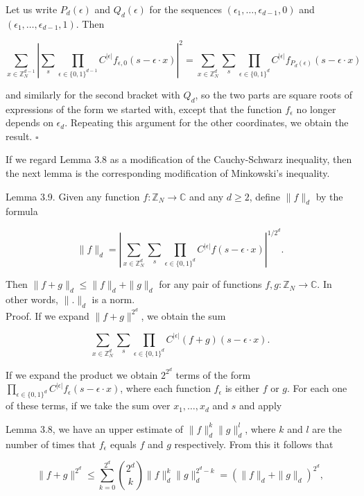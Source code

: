 \documentclass[10pt]{article}
\begin{document}
Let us write $P_{d}(\epsilon)$ and $Q_{d}(\epsilon)$ for the sequences $\left(\epsilon_{1}, \ldots, \epsilon_{d-1}, 0\right)$ and $\left(\epsilon_{1}, \ldots, \epsilon_{d-1}, 1\right)$. Then

$$
\sum_{x \in \mathbb{Z}_{N}^{d-1}}\left|\sum_{s} \prod_{\epsilon \in\{0,1\}^{d-1}} C^{|\epsilon|} f_{\epsilon, 0}(s-\epsilon \cdot x)\right|^{2}=\sum_{x \in \mathbb{Z}_{N}^{d}} \sum_{s} \prod_{\epsilon \in\{0,1\}^{d}} C^{|\epsilon|} f_{P_{d}(\epsilon)}(s-\epsilon \cdot x)
$$

and similarly for the second bracket with $Q_{d}$, so the two parts are square roots of expressions of the form we started with, except that the function $f_{\epsilon}$ no longer depends on $\epsilon_{d}$. Repeating this argument for the other coordinates, we obtain the result. \(\square\)

If we regard Lemma 3.8 as a modification of the Cauchy-Schwarz inequality, then the next lemma is the corresponding modification of Minkowski's inequality.

Lemma 3.9. Given any function $f: \mathbb{Z}_{N} \rightarrow \mathbb{C}$ and any $d \geqslant 2$, define $\|f\|_{d}$ by the formula

$$
\|f\|_{d}=\left|\sum_{x \in \mathbb{Z}_{N}^{d}} \sum_{s} \prod_{\epsilon \in\{0,1\}^{d}} C^{|\epsilon|} f(s-\epsilon \cdot x)\right|^{1 / 2^{d}} .
$$

Then $\|f+g\|_{d} \leqslant\|f\|_{d}+\|g\|_{d}$ for any pair of functions $f, g: \mathbb{Z}_{N} \rightarrow \mathbb{C}$. In other words, $\|.\|_{d}$ is a norm.\\
Proof. If we expand $\|f+g\|^{2^{d}}$, we obtain the sum

$$
\sum_{x \in \mathbb{Z}_{N}^{d}} \sum_{s} \prod_{\epsilon \in\{0,1\}^{d}} C^{|\epsilon|}(f+g)(s-\epsilon \cdot x) .
$$

If we expand the product we obtain $2^{2^{d}}$ terms of the form $\prod_{\epsilon \in\{0,1\}^{d}} C^{|\epsilon|} f_{\epsilon}(s-\epsilon \cdot x)$, where each function $f_{\epsilon}$ is either $f$ or $g$. For each one of these terms, if we take the sum over $x_{1}, \ldots, x_{d}$ and $s$ and apply

Lemma 3.8, we have an upper estimate of $\|f\|_{d}^{k}\|g\|_{d}^{l}$, where $k$ and $l$ are the number of times that $f_{\epsilon}$ equals $f$ and $g$ respectively. From this it follows that

$$
\|f+g\|^{2^{d}} \leqslant \sum_{k=0}^{2^{d}}\binom{2^{d}}{k}\|f\|_{d}^{k}\|g\|_{d}^{2^{d}-k}=\left(\|f\|_{d}+\|g\|_{d}\right)^{2^{d}},
$$
\end{document}
